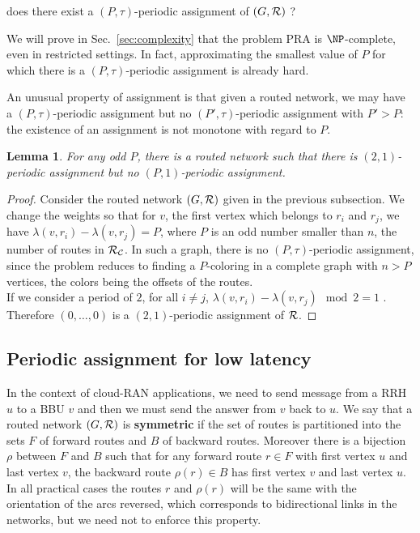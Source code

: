 \documentclass[10pt, conference, letterpaper]{IEEEtran}
\newtheorem{lemma}[theorem]{Lemma}
\begin{document}
       does there exist a $(P,\tau)$-periodic assignment of $(G,\cal R)$ ?


      We will prove in Sec.~\ref{sec:complexity} that the problem PRA is $\NP$-complete, even in restricted settings.
      In fact, approximating the smallest value of $P$ for which there is a $(P,\tau)$-periodic assignment is already hard.
      
      An unusual property of assignment is that given a routed network, we may have a $(P,\tau)$-periodic assignment but no
      $(P',\tau)$-periodic assignment with $P' > P$: the existence of an assignment is not monotone with regard to $P$.

	\begin{lemma} \label{lemma:monotonic}
	 For any odd $P$, there is a routed network such that there is $(2,1)$-periodic assignment but no $(P,1)$-periodic assignment.
	\end{lemma}
\begin{proof}

      Consider the routed network $(G,{\cal R})$ given in the previous subsection. 
      We change the weights so that for $v$, the first vertex which belongs to $r_i$ and $r_j$,
      we have $\lambda(v,r_i) - \lambda(v,r_j)= P$, where $P$ is an odd number smaller than $n$, the number of routes in ${\cal R_{\cal C}}$. In such a graph, there is no $(P,\tau)$-periodic assignment, since the problem reduces to finding a $P$-coloring in a complete graph with $n > P$ vertices, the colors being the offsets of the routes.\\
      If we consider a period of $2$, for all $i \neq j$, $\lambda(v,r_i) - \lambda(v,r_j) \mod 2 = 1$ . Therefore $(0,\dots,0)$ is a $(2,1)$-periodic assignment of ${\cal R}$.      
\end{proof}
      
      
      \subsection{Periodic assignment for low latency}
      In the context of cloud-RAN applications, we need to send message from a RRH $u$ to a BBU $v$ and then 
      we must send the answer from $v$ back to $u$. We say that a routed network $(G, {\cal R})$ is \textbf{symmetric} if the set of routes is partitioned into the sets $F$ of forward routes and $B$ of backward routes. Moreover there is a bijection $\rho$ between $F$ and $B$ such that for any forward route $r \in F$ with first vertex $u$ and last vertex $v$, the backward route $\rho(r) \in B$ has first vertex $v$ and last vertex $u$. In all practical cases the routes $r$ and $\rho(r)$ will be the same with the orientation of the arcs reversed, which corresponds to bidirectional links in the networks, but we need not to enforce this property.
         
\end{document}
